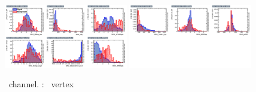 \begin{figure}[htbp]
	\includegraphics[width=0.48\textwidth]{6_Search/Figures/MVAtechnics/singletopzut/eeu/variables_id_c1.png}
	\includegraphics[width=0.48\textwidth]{6_Search/Figures/MVAtechnics/singletopzut/eeu/variables_id_c2.png}
	\caption{\eemu\ channel. \STSR: \Zut\ vertex }
	\label{image:Figureseeusingletopzut}
\end{figure}


